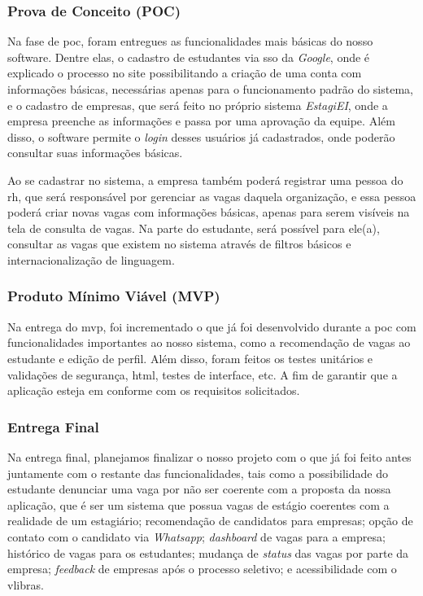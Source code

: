 \subsubsection{Prova de Conceito (POC)} \label{entrega-poc}

Na fase de \ac{poc}, foram entregues as funcionalidades mais básicas do nosso software. Dentre elas, o cadastro de estudantes via \ac{sso} da \textit{Google}, onde é explicado o processo no site possibilitando a criação de uma conta com informações básicas, necessárias apenas para o funcionamento padrão do sistema, e o cadastro de empresas, que será feito no próprio sistema \emph{EstagiEI}, onde a empresa preenche as informações e passa por uma aprovação da equipe. Além disso, o software permite o \textit{login} desses usuários já cadastrados, onde poderão consultar suas informações básicas.

Ao se cadastrar no sistema, a empresa também poderá registrar uma pessoa do \ac{rh}, que será responsável por gerenciar as vagas daquela organização, e essa pessoa poderá criar novas vagas com informações básicas, apenas para serem visíveis na tela de consulta de vagas. Na parte do estudante, será possível para ele(a), consultar as vagas que existem no sistema através de filtros básicos e internacionalização de linguagem.

\subsubsection{Produto Mínimo Viável (MVP)}

Na entrega do \ac{mvp}, foi incrementado o que já foi desenvolvido durante a \ac{poc} com funcionalidades importantes ao nosso sistema, como a recomendação de vagas ao estudante e edição de perfil. Além disso, foram feitos os testes unitários e validações de segurança, \ac{html}, testes de interface, etc. A fim de garantir que a aplicação esteja em conforme com os requisitos solicitados.

\subsubsection{Entrega Final}

Na entrega final, planejamos finalizar o nosso projeto com o que já foi feito antes juntamente com o restante das funcionalidades, tais como a possibilidade do estudante denunciar uma vaga por não ser coerente com a proposta da nossa aplicação, que é ser um sistema que possua vagas de estágio coerentes com a realidade de um estagiário; recomendação de candidatos para empresas; opção de contato com o candidato via \textit{Whatsapp}; \textit{dashboard} de vagas para a empresa; histórico de vagas para os estudantes; mudança de \textit{status} das vagas por parte da empresa; \textit{feedback} de empresas após o processo seletivo; e acessibilidade com o \gls{vlibras}.

